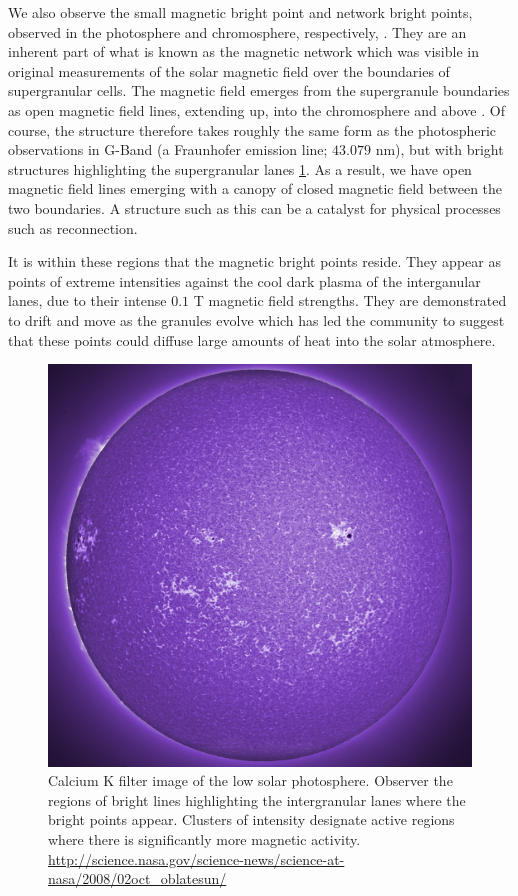 We also observe the small magnetic bright point and network bright points, observed in the photosphere and chromosphere, respectively, \cite{SanchesAlmeida2010}.
They are an inherent part of what is known as the magnetic network which was visible in original measurements of the solar magnetic field over the boundaries of supergranular cells.
The magnetic field emerges from the supergranule boundaries as open magnetic field lines, extending up, into the chromosphere and above \citep{Hasan2005}.
Of course, the structure therefore takes roughly the same form as the photospheric observations in G-Band (a Fraunhofer emission line; $43.079$ nm), but with bright structures highlighting the supergranular lanes \ref{fig:mag_network}.
As a result, we have open magnetic field lines emerging with a canopy of closed magnetic field between the two boundaries.
A structure such as this can be a catalyst for physical processes such as reconnection.

It is within these regions that the magnetic bright points reside.
They appear as points of extreme intensities against the cool dark plasma of the interganular lanes, due to their intense $0.1$ T magnetic field strengths.
They are demonstrated to drift and move as the granules evolve \citep{Chitta2012} which has led the community to suggest that these points could diffuse large amounts of heat into the solar atmosphere.

\begin{figure}
	\includegraphics[width=\linewidth]{Chapter1/Figs/magnetic_network}
	\caption{Calcium K filter image of the low solar photosphere. Observer the regions of bright lines highlighting the intergranular lanes where the bright points appear. Clusters of intensity designate active regions where there is significantly more magnetic activity. 
		\url{http://science.nasa.gov/science-news/science-at-nasa/2008/02oct_oblatesun/}}
	\label{fig:mag_network}
\end{figure}

